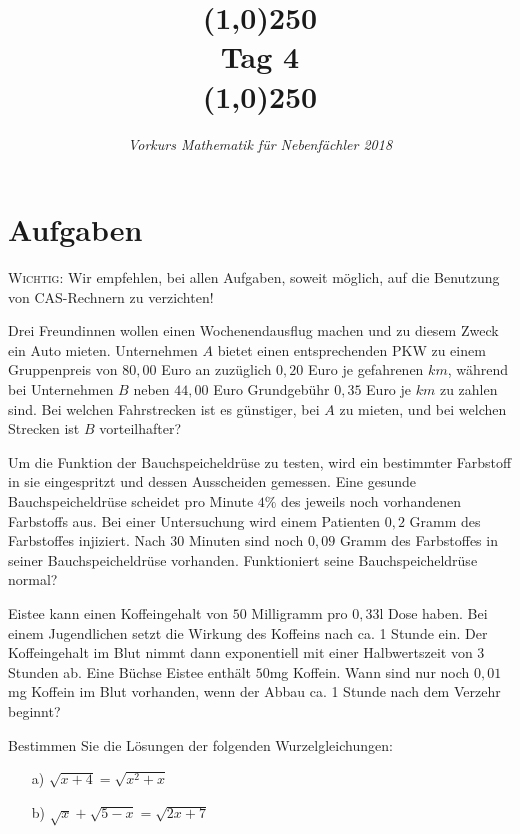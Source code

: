 \documentclass[11pt]{article}
\begin{document}
\title{\line(1,0){250}\\Tag 4\\\line(1,0){250}}
\date{}
\author{\itshape Vorkurs Mathematik für Nebenfächler 2018}
\maketitle
\section*{Aufgaben}
\textsc{Wichtig:} Wir empfehlen, bei allen Aufgaben, soweit möglich, auf die Benutzung von CAS-Rechnern zu verzichten!
\begin{task}
	Drei Freundinnen wollen einen Wochenendausflug machen und zu diesem Zweck ein Auto mieten.
	Unternehmen $A$ bietet einen entsprechenden PKW zu einem Gruppenpreis von $80,00$ Euro an zuz\"uglich $0,20$ Euro je gefahrenen $km$, w\"ahrend bei Unternehmen $B$ neben
	$44,00$ Euro Grundgeb\"uhr $0,35$ Euro je $km$ zu zahlen sind. Bei welchen Fahrstrecken ist es g\"unstiger, bei $A$ zu mieten, und bei welchen Strecken ist $B$ vorteilhafter?
\end{task}
\dotfill
\begin{task}
	Um die Funktion der Bauchspeicheldr\"use zu testen, wird ein bestimmter Farbstoff in sie eingespritzt und dessen Ausscheiden gemessen. Eine gesunde Bauchspeicheldr\"use
	scheidet pro Minute $4 \%$ des jeweils noch vorhandenen Farbstoffs aus. Bei einer Untersuchung wird einem Patienten $0,2$ Gramm des Farbstoffes injiziert. Nach
	$30$ Minuten sind noch $0,09$ Gramm des Farbstoffes in seiner Bauchspeicheldr\"use vorhanden. Funktioniert seine Bauchspeicheldr\"use normal?
\end{task}
\begin{task}
	Eistee kann einen Koffeingehalt von $50$ Milligramm pro $0,33$l Dose haben. Bei einem Jugendlichen setzt die Wirkung des Koffeins nach ca. 1 Stunde ein. Der Koffeingehalt im Blut nimmt dann exponentiell
	mit einer Halbwertszeit von $3$ Stunden ab. Eine B\"uchse Eistee enth\"alt $50$mg Koffein. Wann sind nur noch $0,01$mg Koffein im Blut vorhanden, wenn der Abbau ca. 1 Stunde nach dem Verzehr beginnt?
\end{task}
\dotfill
\begin{task}
Bestimmen Sie die L\"osungen der folgenden Wurzelgleichungen: 
\begin{enumerate}[i)]
	\item[a)] $\sqrt{x+4}=\sqrt{x^2+x}$
	\item[b)] $\sqrt{x}+\sqrt{5-x}=\sqrt{2x+7}$
\end{enumerate}  
\end{task}
\end{document}
